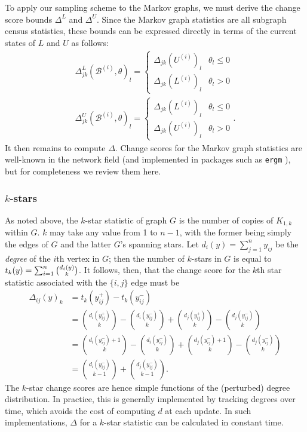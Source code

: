 \documentclass[11pt]{article}
\begin{document}
To apply our sampling scheme to the Markov graphs, we must derive the change score bounds $\Delta^L$ and $\Delta^U$.  Since the Markov graph statistics are all subgraph census statistics, these bounds can be expressed directly in terms of the current states of $L$ and $U$ as follows:
\begin{gather}
\Delta^L_{jk}\left(\mathcal{B}^{(i)},\theta\right)_l = \begin{cases} \Delta_{jk}\left(U^{(i)}\right)_l& \theta_l \le 0\\ \Delta_{jk}\left(L^{(i)}\right)_l& \theta_l > 0\end{cases} \label{eq_deltalmg}\\
\Delta^U_{jk}\left(\mathcal{B}^{(i)},\theta\right)_l = \begin{cases} \Delta_{jk}\left(L^{(i)}\right)_l& \theta_l \le 0\\ \Delta_{jk}\left(U^{(i)}\right)_l& \theta_l > 0\end{cases}. \label{eq_deltaumg}
\end{gather}
It then remains to compute $\Delta$.  Change scores for the Markov graph statistics are well-known in the network field (and implemented in packages such as \texttt{ergm} \citep{hunter.et.al:jss:2008}), but for completeness we review them here.  

\subsubsection{$k$-stars}

As noted above, the $k$-star statistic of graph $G$ is the number of copies of $K_{1,k}$ within $G$.  $k$ may take any value from 1 to $n-1$, with the former being simply the edges of $G$ and the latter $G$'s spanning stars.  Let $d_i(y)=\sum_{j=1}^n y_{ij}$ be the \emph{degree} of the $i$th vertex in $G$; then the number of $k$-stars in $G$ is equal to $t_k(y) = \sum_{i=1}^{n} \tbinom{d_i(y)}{k}$.  It follows, then, that the change score for the $k$th star statistic associated with the $\{i,j\}$ edge must be
\begin{align}
\Delta_{ij}(y)_k &= t_k\left(y^+_{ij}\right)-t_k\left(y^-_{ij}\right)\\
&= \binom{d_i(y^+_{ij})}{k}-\binom{d_i(y^-_{ij})}{k} + \binom{d_j(y^+_{ij})}{k}-\binom{d_j(y^-_{ij})}{k}\\
&= \binom{d_i(y^-_{ij})+1}{k}-\binom{d_i(y^-_{ij})}{k} + \binom{d_j(y^-_{ij})+1}{k}-\binom{d_j(y^-_{ij})}{k}\\
&=\binom{d_i(y^-_{ij})}{k-1}+\binom{d_j(y^-_{ij})}{k-1}.
\end{align}
The $k$-star change scores are hence simple functions of the (perturbed) degree distribution.  In practice, this is generally implemented by tracking degrees over time, which avoids the cost of computing $d$ at each update.  In such implementations, $\Delta$ for a $k$-star statistic can be calculated in constant time.
\end{document}
